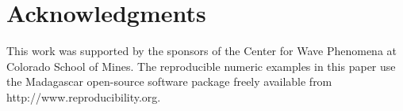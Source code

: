 \section{Acknowledgments}
%
This work was supported by the sponsors of the Center for Wave Phenomena at Colorado School of Mines.
%
The reproducible numeric examples in this paper use the Madagascar open-source software package freely available from http://www.reproducibility.org.
%
